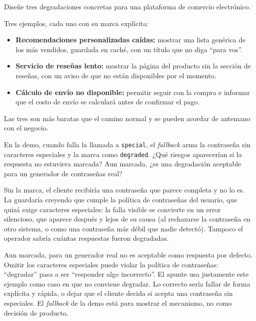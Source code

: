 \documentclass[variant=guia,cover=institutional,mode=screen]{ua-engineering-v6-article}
\begin{document}
\begin{uaexercise}
Diseñe tres degradaciones concretas para una plataforma de comercio electrónico.
\end{uaexercise}
\begin{uaanswer}
Tres ejemplos, cada uno con su marca explícita:
\begin{itemize}
\item \textbf{Recomendaciones personalizadas caídas:} mostrar una lista genérica de los más vendidos, guardada en caché, con un título que no diga ``para vos''.
\item \textbf{Servicio de reseñas lento:} mostrar la página del producto sin la sección de reseñas, con un aviso de que no están disponibles por el momento.
\item \textbf{Cálculo de envío no disponible:} permitir seguir con la compra e informar que el costo de envío se calculará antes de confirmar el pago.
\end{itemize}
Las tres son más baratas que el camino normal y se pueden acordar de antemano con el negocio.
\end{uaanswer}

\begin{uaexercise}
En la demo, cuando falla la llamada a \texttt{special}, el \emph{fallback} arma la contraseña sin caracteres especiales y la marca como \texttt{degraded}. ¿Qué riesgos aparecerían si la respuesta no estuviera marcada? Aun marcada, ¿es una degradación aceptable para un generador de contraseñas real?
\end{uaexercise}
\begin{uaanswer}
Sin la marca, el cliente recibiría una contraseña que parece completa y no lo es. La guardaría creyendo que cumple la política de contraseñas del usuario, que quizá exige caracteres especiales: la falla visible se convierte en un error silencioso, que aparece después y lejos de su causa (al rechazarse la contraseña en otro sistema, o como una contraseña más débil que nadie detectó). Tampoco el operador sabría cuántas respuestas fueron degradadas.

Aun marcada, para un generador real no es aceptable como respuesta por defecto. Omitir los caracteres especiales puede violar la política de contraseñas: ``degradar'' pasa a ser ``responder algo incorrecto''. El apunte usa justamente este ejemplo como caso en que no conviene degradar. Lo correcto sería fallar de forma explícita y rápida, o dejar que el cliente decida si acepta una contraseña sin especiales. El \emph{fallback} de la demo está para mostrar el mecanismo, no como decisión de producto.
\end{uaanswer}
\end{document}
